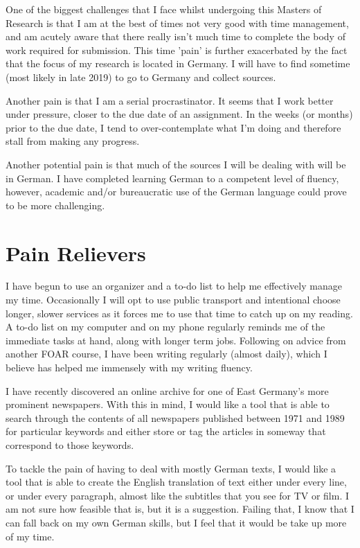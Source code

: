 \documentclass{article}
\begin{document}
One of the biggest challenges that I face whilst undergoing this Masters of Research is that I am at the best of times not very good with time management, and am acutely aware that there really isn't much time to complete the body of work required for submission. This time 'pain' is further exacerbated by the fact that the focus of my research is located in Germany. I will have to find sometime (most likely in late 2019) to go to Germany and collect sources.

Another pain is that I am a serial procrastinator. It seems that I work better under pressure, closer to the due date of an assignment. In the weeks (or months) prior to the due date, I tend to over-contemplate what I'm doing and therefore stall from making any progress.

Another potential pain is that much of the sources I will be dealing with will be in German. I have completed learning German to a competent level of fluency, however, academic and/or bureaucratic use of the German language could prove to be more challenging.

\section{Pain Relievers}

I have begun to use an organizer and a to-do list to help me effectively manage my time. Occasionally I will opt to use public transport and intentional choose longer, slower services as it forces me to use that time to catch up on my reading. A to-do list on my computer and on my phone regularly reminds me of the immediate tasks at hand, along with longer term jobs. Following on advice from another FOAR course, I have been writing regularly (almost daily), which I believe has helped me immensely with my writing fluency.

I have recently discovered an online archive for one of East Germany's more prominent newspapers. With this in mind, I would like a tool that is able to search through the contents of all newspapers published between 1971 and 1989 for particular keywords and either store or tag the articles in someway that correspond to those keywords.

To tackle the pain of having to deal with mostly German texts, I would like a tool that is able to create the English translation of text either under every line, or under every paragraph, almost like the subtitles that you see for TV or film. I am not sure how feasible that is, but it is a suggestion. Failing that, I know that I can fall back on my own German skills, but I feel that it would be take up more of my time.
\end{document}
